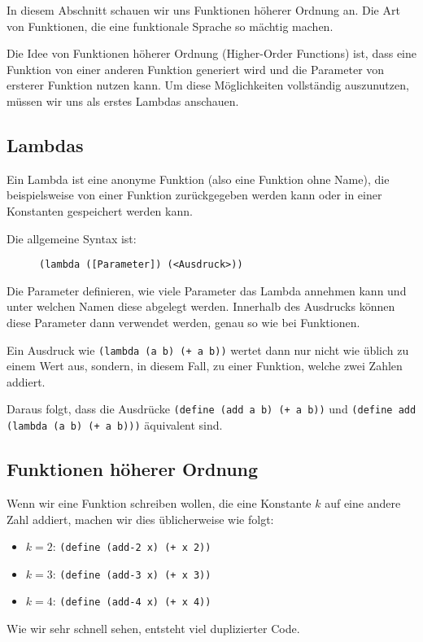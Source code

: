 \label{sec:higher_order_func}

In diesem Abschnitt schauen wir uns Funktionen höherer Ordnung an. Die Art von Funktionen, die eine funktionale Sprache so mächtig machen.

Die Idee von Funktionen höherer Ordnung (Higher-Order Functions) ist, dass eine Funktion von einer anderen Funktion generiert wird und die Parameter von ersterer Funktion nutzen kann. Um diese Möglichkeiten vollständig auszunutzen, müssen wir uns als erstes Lambdas anschauen.

\subsection{Lambdas}
	Ein Lambda ist eine anonyme Funktion (also eine Funktion ohne Name), die beispielsweise von einer Funktion zurückgegeben werden kann oder in einer Konstanten gespeichert werden kann.
	
	Die allgemeine Syntax ist:
	\begin{figure}[H]
		\centering
		\lstinline[language = Racket]|(lambda ([Parameter]) (<Ausdruck>))|
	\end{figure}
	Die Parameter definieren, wie viele Parameter das Lambda annehmen kann und unter welchen Namen diese abgelegt werden. Innerhalb des Ausdrucks können diese Parameter dann verwendet werden, genau so wie bei Funktionen.
	
	Ein Ausdruck wie \lstinline[language = Racket]|(lambda (a b) (+ a b))| wertet dann nur nicht wie üblich zu einem Wert aus, sondern, in diesem Fall, zu einer Funktion, welche zwei Zahlen addiert.
	
	Daraus folgt, dass die Ausdrücke \lstinline[language = Racket]|(define (add a b) (+ a b))| und \lstinline[language = Racket]|(define add (lambda (a b) (+ a b)))| äquivalent sind.

\subsection{Funktionen höherer Ordnung}
	Wenn wir eine Funktion schreiben wollen, die eine Konstante \(k\) auf eine andere Zahl addiert, machen wir dies üblicherweise wie folgt:
	\begin{itemize}
		\item \( k = 2 \): \lstinline[language = Racket]|(define (add-2 x) (+ x 2))|
		\item \( k = 3 \): \lstinline[language = Racket]|(define (add-3 x) (+ x 3))|
		\item \( k = 4 \): \lstinline[language = Racket]|(define (add-4 x) (+ x 4))|
	\end{itemize}
	Wie wir sehr schnell sehen, entsteht viel duplizierter Code.
	
